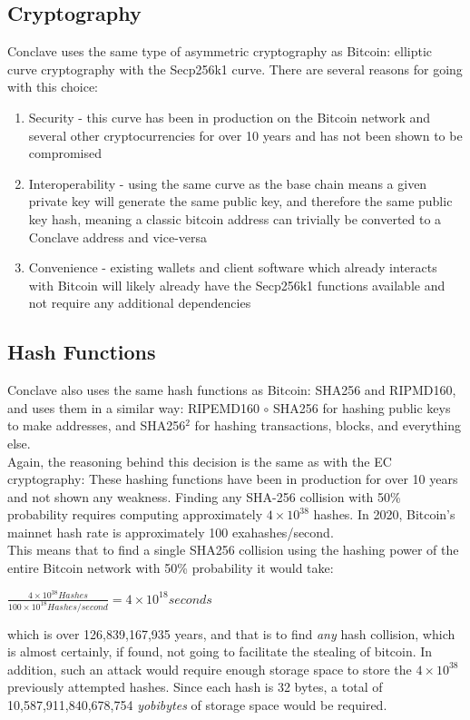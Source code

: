 \documentclass{report}
\begin{document}
		\subsection{Cryptography}
		Conclave uses the same type of asymmetric cryptography as Bitcoin: elliptic curve cryptography with the Secp256k1 \cite{secp256k1} curve. There are several reasons for going with this choice:
		  \begin{enumerate}
		  	\item Security - this curve has been in production on the Bitcoin network and several other cryptocurrencies for over 10 years and has not been shown to be compromised
		  	\item Interoperability - using the same curve as the base chain means a given private key will generate the same public key, and therefore the same public key hash, meaning a classic bitcoin address can trivially be converted to a Conclave address and vice-versa 
		    \item Convenience - existing wallets and client software which already interacts with Bitcoin will likely already have the Secp256k1 functions available and not require any additional dependencies 
		  \end{enumerate}
		\subsection{Hash Functions}
		Conclave also uses the same hash functions as Bitcoin: SHA256 and RIPMD160, and uses them in a similar way: RIPEMD160 $\circ$ SHA256 for hashing public keys to make addresses, and SHA256$^2$ for hashing transactions, blocks, and everything else. \\
		
		Again, the reasoning behind this decision is the same as with the EC cryptography: These hashing functions have been in production for over 10 years and not shown any weakness. Finding any SHA-256 collision with 50\% probability requires computing approximately $4 \times 10^{38}$ \cite{bday} hashes. In 2020, Bitcoin's mainnet hash rate is approximately 100 exahashes/second.  \\
		
		This means that to find a single SHA256 collision using the hashing power of the entire Bitcoin network with 50\% probability it would take:
		\begin{center}
		$\frac{4 \times 10^{38} Hashes}{100 \times 10^{18} Hashes/second} = 4 \times 10^{18} seconds$
		\end{center}
		which is over 126,839,167,935 years, and that is to find \textit{any} hash collision, which is almost certainly, if found, not going to facilitate the stealing of bitcoin. In addition, such an attack would require enough storage space to store the $4 \times 10^{38}$ previously attempted hashes. Since each hash is 32 bytes, a total of 10,587,911,840,678,754 \textit{yobibytes} \cite{yobibyte}  of storage space would be required.
		
\end{document}
